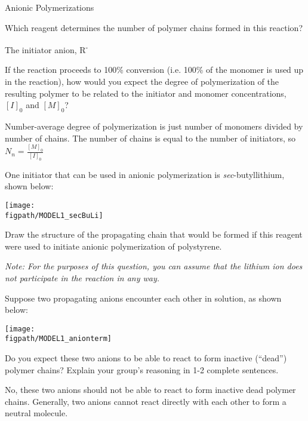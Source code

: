 \begin{activity}{Anionic Polymerizations}
\begin{ctqs}
	
	\question Which reagent determines the number of polymer chains formed in this reaction?
	
		\begin{solution}[0.25in]
			The initiator anion, R\textsuperscript{-}
		\end{solution}
	
	\question If the reaction proceeds to 100\% conversion (i.e. 100\% of the monomer is used up in the reaction), how would you expect the degree of polymerization of the resulting polymer to be related to the initiator and monomer concentrations, $[I]_0$ and $[M]_0$?
	
		\begin{solution}[0.5in]
			Number-average degree of polymerization is just number of monomers divided by number of chains.  The number of chains is equal to the number of initiators, so $N_n = \frac{[M]_0}{[I]_0}$
		\end{solution}
	
	\question One initiator that can be used in anionic polymerization is \emph{sec}-butyllithium, shown below:
	 \label{\labelbase:ctq:ps-anionic-prop}
	
	\centerline{\texttt{[image: \\figpath/MODEL1\_secBuLi]}}
	 	
	 	Draw the structure of the propagating chain that would be formed if this reagent were used to initiate anionic polymerization of polystyrene.
	 	
	 	\emph{Note: For the purposes of this question, you can assume that the lithium ion does not participate in the reaction in any way.}
	
		\begin{solution}[1in]
		\studentdisplay{}
		\end{solution}
	
	\question Suppose two propagating anions encounter each other in solution, as shown below:
	
	\centerline{\texttt{[image: \\figpath/MODEL1\_anionterm]}}
	
		Do you expect these two anions to be able to react to form inactive (``dead'') polymer chains?  Explain your group's reasoning in 1-2 complete sentences.
	
		\begin{solution}[1.25in]
			No, these two anions should not be able to react to form inactive dead polymer chains.  Generally, two anions cannot react directly with each other to form a neutral molecule.
		\end{solution}
	

\end{ctqs}
\end{activity}
